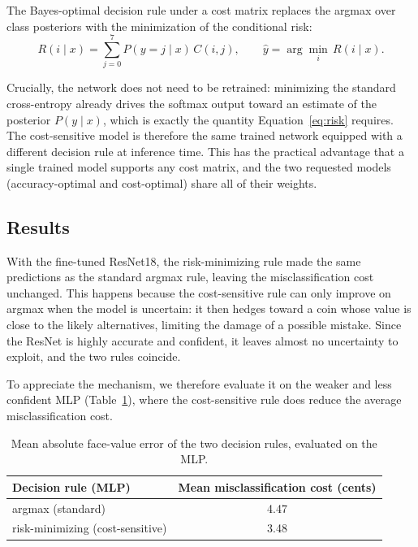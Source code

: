 \documentclass[11pt,a4paper]{article}
\begin{document}
The Bayes-optimal decision rule under a cost matrix replaces the argmax over class
posteriors with the minimization of the conditional risk:
\begin{equation}
  R(i \mid x) = \sum_{j=0}^{7} P(y = j \mid x)\, C(i, j),
  \qquad
  \hat{y} = \arg\min_i\, R(i \mid x).
  \label{eq:risk}
\end{equation}

Crucially, the network does not need to be retrained: minimizing the standard
cross-entropy already drives the softmax output toward an estimate of the posterior
$P(y \mid x)$, which is exactly the quantity Equation~\eqref{eq:risk} requires. The
cost-sensitive model is therefore the same trained network equipped with a different
decision rule at inference time. This has the practical advantage that a single trained
model supports any cost matrix, and the two requested models (accuracy-optimal and
cost-optimal) share all of their weights.
\subsection{Results}
 
With the fine-tuned ResNet18, the risk-minimizing rule made the same predictions as the
standard argmax rule, leaving the misclassification cost unchanged. This happens because
the cost-sensitive rule can only improve on argmax when the model is uncertain: it then
hedges toward a coin whose value is close to the likely alternatives, limiting the damage
of a possible mistake. Since the ResNet is highly accurate and confident, it leaves almost
no uncertainty to exploit, and the two rules coincide.
 
To appreciate the mechanism, we therefore evaluate it on the weaker and less confident MLP
(Table~\ref{tab:cost}), where the cost-sensitive rule does reduce the average
misclassification cost.
 
\begin{table}[ht]
  \centering
  \begin{tabular}{lc}
    \toprule
    Decision rule (MLP) & Mean misclassification cost (cents) \\
    \midrule
    argmax (standard) & 4.47 \\
    risk-minimizing (cost-sensitive) & 3.48 \\
    \bottomrule
  \end{tabular}
  \caption{Mean absolute face-value error of the two decision rules, evaluated on the MLP.}
  \label{tab:cost}
\end{table}
 
\end{document}
